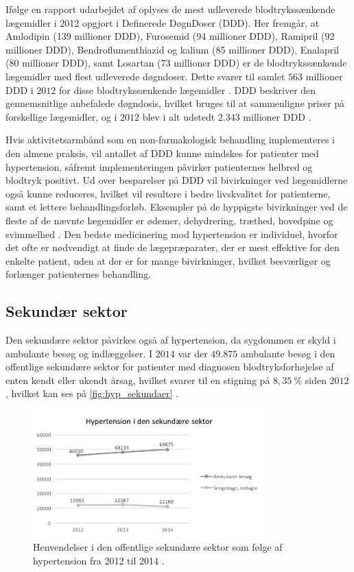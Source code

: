 Ifølge en rapport udarbejdet af \citeauthor{apotekerforeningen2012} oplyses de mest udleverede blodtrykssænkende lægemidler i 2012 opgjort i Definerede DøgnDoser (DDD). Her fremgår, at Amlodipin (139 millioner DDD), Furosemid (94 millioner DDD), Ramipril (92 millioner DDD), Bendroflumenthiazid og kalium (85 millioner DDD), Enalapril (80 millioner DDD), samt Losartan (73 millioner DDD) er de blodtrykssænkende lægemidler med flest udleverede døgndoser. Dette svarer til samlet $563$ millioner DDD i $2012$ for disse blodtrykssænkende lægemidler \citep{apotekerforeningen2012}. DDD beskriver den gennemsnitlige anbefalede døgndosis, hvilket bruges til at sammenligne priser på forskellige lægemidler, og i $2012$ blev i alt udstedt $2.343$ millioner DDD \citep{medicinoekonomi2015}. 

Hvis aktivitetsarmbånd som en non-farmakologisk  behandling implementeres i den almene praksis, vil antallet af DDD kunne mindskes for patienter med hypertension, såfremt implementeringen påvirker patienternes helbred og blodtryk positivt. Ud over besparelser på DDD vil bivirkninger ved lægemidlerne også kunne reduceres, hvilket vil resultere i bedre livskvalitet for patienterne, samt et lettere behandlingsforløb. Eksempler på de hyppigste bivirkninger ved de fleste af de nævnte lægemidler er ødemer, dehydrering, træthed, hovedpine og svimmelhed \citep{olsen2015}. Den bedste medicinering mod hypertension er individuel, hvorfor det ofte er nødvendigt at finde de lægepræparater, der er mest effektive for den enkelte patient, uden at der er for mange bivirkninger, hvilket besværligør og forlænger patienternes behandling.

\subsection{Sekundær sektor}
Den sekundære sektor påvirkes også af hypertension, da sygdommen er skyld i ambulante besøg og indlæggelser. I $2014$ var der $49.875$ ambulante besøg i den offentlige sekundære sektor for patienter med diagnosen blodtryksforhøjelse af enten kendt eller ukendt årsag, hvilket svarer til en stigning på $8,35~\%$ siden $2012$, hvilket kan ses på \autoref{fig:hyp_sekundaer} \citep{sundhedsdatastyrelsen2016}. 

\begin{figure}[H]
\centering
\includegraphics[width=0.8\textwidth]{figures/hyp_sekundaer}
\caption{Henvendelser i den offentlige sekundære sektor som følge af hypertension fra 2012 til 2014 \citep{sundhedsdatastyrelsen2016}.}
\label{fig:hyp_sekundaer}
\end{figure}

